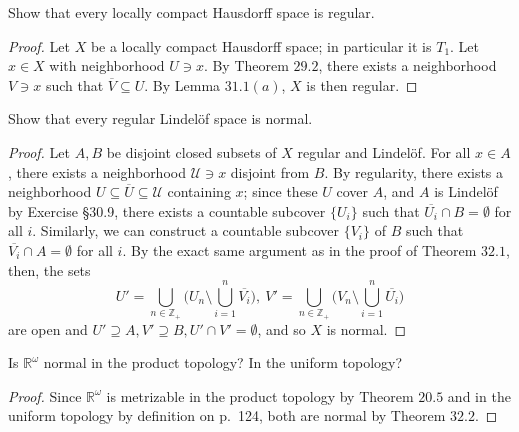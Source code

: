 \documentclass[12pt]{article}
\theoremstyle{remark}
\begin{document}
\setcounter{subsubsection}{2}
\begin{problem}\label{exc:32.3}
  Show that every locally compact Hausdorff space is regular.
\end{problem}
\begin{proof}
  Let $X$ be a locally compact Hausdorff space; in particular it is $T_1$.
  Let $x \in X$ with neighborhood $U \ni x$. By Theorem $29.2$, there exists a neighborhood $V \ni x$ such that $\overline{V} \subseteq U$. By Lemma $31.1(a)$, $X$ is then regular.
\end{proof}

\begin{problem}
  Show that every regular Lindel\"of space is normal.
\end{problem}
\begin{proof}
  Let $A,B$ be disjoint closed subsets of $X$ regular and Lindel\"of. For all $x \in A$, there exists a neighborhood $\mathcal{U} \ni x$ disjoint from $B$. By regularity, there exists a neighborhood $U \subseteq \overline{U} \subseteq \mathcal{U}$ containing $x$; since these $U$ cover $A$, and $A$ is Lindel\"of by Exercise \S30.9, there exists a countable subcover $\{U_i\}$ such that $\overline{U_i} \cap B = \emptyset$ for all $i$. Similarly, we can construct a countable subcover $\{V_i\}$ of $B$ such that $\overline{V_i} \cap A = \emptyset$ for all $i$. By the exact same argument as in the proof of Theorem $32.1$, then, the sets
  \begin{equation*}
    U' = \bigcup_{n \in \mathbb{Z}_+} \bigg( U_n \setminus \bigcup_{i=1}^n \overline{V_i} \bigg), ~ V' = \bigcup_{n \in \mathbb{Z}_+} \bigg( V_n \setminus \bigcup_{i=1}^n \overline{U_i} \bigg)
  \end{equation*}
  are open and $U' \supseteq A, V' \supseteq B, U' \cap V' = \emptyset$, and so $X$ is normal.
\end{proof}

\begin{problem}
  Is $\mathbb{R}^\omega$ normal in the product topology? In the uniform topology?
\end{problem}
\begin{proof}
  Since $\mathbb{R}^\omega$ is metrizable in the product topology by Theorem $20.5$ and in the uniform topology by definition on p.~124, both are normal by Theorem $32.2$.
\end{proof}
\end{document}
